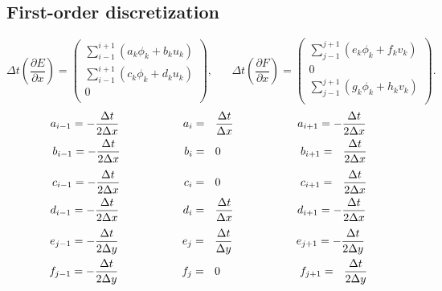 \documentclass[a4paper]{PRseminar}
\begin{document}
\subsection{First-order discretization}
	\begin{equation}
		\Delta t\left(\frac{\partial E}{\partial x}\right)=
		\left(\begin{array}{c}
			\sum_{i-1}^{i+1}\left(a_k\phi_k+b_ku_k\right)  \\
			\sum_{i-1}^{i+1}\left(c_k\phi_k+d_ku_k\right)  \\
			0 \\
		\end{array}\right),
		\hspace{20pt}
		\Delta t\left(\frac{\partial F}{\partial x}\right)=
		\left(\begin{array}{c}
			\sum_{j-1}^{j+1}\left(e_k\phi_k+f_kv_k\right)  \\
			0\\
			\sum_{j-1}^{j+1}\left(g_k\phi_k+h_kv_k\right)  \\
		\end{array}\right).
	\end{equation}
	\begin{align}
		a_{i-1} =-   \frac{\Delta t}{2\Delta x}\hspace{20mm}
		a_{i  }&=\ \ \frac{\Delta t}{ \Delta x}\hspace{20mm}
		a_{i+1} =-   \frac{\Delta t}{2\Delta x}\\
		b_{i-1} =-   \frac{\Delta t}{2\Delta x}\hspace{20mm}
		b_{i  }&=\ \ 0                         \hspace{25mm}
		b_{i+1} =\ \ \frac{\Delta t}{2\Delta x}
	\end{align}
	\begin{align}
		c_{i-1} =-   \frac{\Delta t}{2\Delta x}\hspace{20mm}
		c_{i  }&=\ \ 0                         \hspace{25mm}
		c_{i+1} =\ \ \frac{\Delta t}{2\Delta x}\\
		d_{i-1} =-   \frac{\Delta t}{2\Delta x}\hspace{20mm}
		d_{i  }&=\ \ \frac{\Delta t}{ \Delta x}\hspace{20mm}
		d_{i+1} =-   \frac{\Delta t}{2\Delta x}
	\end{align}
	\begin{align}
		e_{j-1} =-   \frac{\Delta t}{2\Delta y}\hspace{20mm}
		e_{j  }&=\ \ \frac{\Delta t}{ \Delta y}\hspace{20mm}
		e_{j+1} =-   \frac{\Delta t}{2\Delta y}\\
		f_{j-1} =-   \frac{\Delta t}{2\Delta y}\hspace{20mm}
		f_{j  }&=\ \ 0                         \hspace{25mm}
		f_{j+1} =\ \ \frac{\Delta t}{2\Delta y}
	\end{align}
\end{document}
